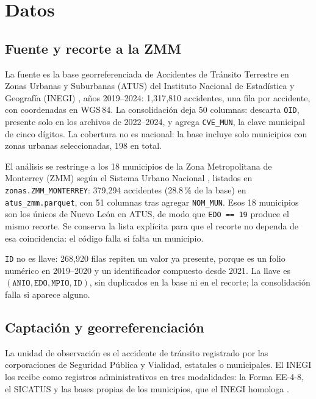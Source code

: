 \section{Datos}\label{sec:datos}

\subsection{Fuente y recorte a la ZMM}\label{sec:datos-fuente}

La fuente es la base georreferenciada de Accidentes de Tránsito Terrestre en
Zonas Urbanas y Suburbanas (ATUS) del Instituto Nacional de Estadística y
Geografía (INEGI) \parencite{inegi_atus}, años 2019--2024: 1,317,810 accidentes,
una fila por accidente, con coordenadas en WGS\,84. La consolidación deja 50
columnas: descarta \texttt{OID}, presente solo en los archivos de 2022--2024, y
agrega \texttt{CVE\_MUN}, la clave municipal de cinco dígitos. La cobertura no es
nacional: la base incluye solo municipios con zonas urbanas seleccionadas, 198 en
total.

El análisis se restringe a los 18 municipios de la Zona Metropolitana de
Monterrey (ZMM) según el Sistema Urbano Nacional \parencite{sun2018}, listados en
\texttt{zonas.ZMM\_MONTERREY}: 379,294 accidentes (28.8\,\% de la base) en
\texttt{atus\_zmm.parquet}, con 51 columnas tras agregar \texttt{NOM\_MUN}.
Esos 18 municipios son los únicos de Nuevo León en ATUS, de modo que
\texttt{EDO == 19} produce el mismo recorte. Se conserva la lista explícita para
que el recorte no dependa de esa coincidencia: el código falla si falta un
municipio.

\texttt{ID} no es llave: 268,920 filas repiten un valor ya presente, porque es un
folio numérico en 2019--2020 y un identificador compuesto desde 2021. La llave es
$(\texttt{ANIO}, \texttt{EDO}, \texttt{MPIO}, \texttt{ID})$, sin duplicados en la
base ni en el recorte; la consolidación falla si aparece alguno.

\subsection{Captación y georreferenciación}\label{sec:datos-captacion}

La unidad de observación es el accidente de tránsito registrado por las
corporaciones de Seguridad Pública y Vialidad, estatales o municipales. El INEGI
los recibe como registros administrativos en tres modalidades: la Forma EE-4-8,
el SICATUS y las bases propias de los municipios, que el INEGI homologa
\parencite{inegi_sintesis2016}.

